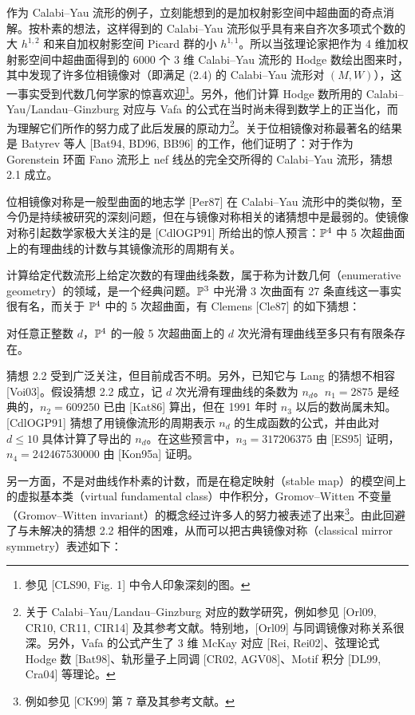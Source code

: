 作为 Calabi–Yau 流形的例子，立刻能想到的是加权射影空间中超曲面的奇点消解。按朴素的想法，这样得到的 Calabi–Yau 流形似乎具有来自齐次多项式个数的大 $h^{1,2}$ 和来自加权射影空间 Picard 群的小 $h^{1,1}$。所以当弦理论家把作为 4 维加权射影空间中超曲面得到的 6000 个 3 维 Calabi–Yau 流形的 Hodge 数绘出图来时，其中发现了许多位相镜像对（即满足 (2.4) 的 Calabi–Yau 流形对 $(M,W)$），这一事实受到代数几何学家的惊喜欢迎\footnote{参见 [CLS90, Fig. 1] 中令人印象深刻的图。}。另外，他们计算 Hodge 数所用的 Calabi–Yau/Landau–Ginzburg 对应与 Vafa 的公式在当时尚未得到数学上的正当化，而为理解它们所作的努力成了此后发展的原动力\footnote{关于 Calabi–Yau/Landau–Ginzburg 对应的数学研究，例如参见 [Orl09, CR10, CR11, CIR14] 及其参考文献。特别地，[Orl09] 与同调镜像对称关系很深。另外，Vafa 的公式产生了 3 维 McKay 对应 [Rei, Rei02]、弦理论式 Hodge 数 [Bat98]、轨形量子上同调 [CR02, AGV08]、Motif 积分 [DL99, Cra04] 等理论。}。关于位相镜像对称最著名的结果是 Batyrev 等人 [Bat94, BD96, BB96] 的工作，他们证明了：对于作为 Gorenstein 环面 Fano 流形上 nef 线丛的完全交所得的 Calabi–Yau 流形，猜想 2.1 成立。


位相镜像对称是一般型曲面的地志学 [Per87] 在 Calabi–Yau 流形中的类似物，至今仍是持续被研究的深刻问题，但在与镜像对称相关的诸猜想中是最弱的。使镜像对称引起数学家极大关注的是 [CdlOGP91] 所给出的惊人预言：$\mathbb{P}^4$ 中 5 次超曲面上的有理曲线的计数与其镜像流形的周期有关。

计算给定代数流形上给定次数的有理曲线条数，属于称为计数几何（enumerative geometry）的领域，是一个经典问题。$\mathbb{P}^3$ 中光滑 3 次曲面有 27 条直线这一事实很有名，而关于 $\mathbb{P}^4$ 中的 5 次超曲面，有 Clemens [Cle87] 的如下猜想：

 对任意正整数 $d$，$\mathbb{P}^4$ 的一般 5 次超曲面上的 $d$ 次光滑有理曲线至多只有有限条存在。

猜想 2.2 受到广泛关注，但目前成否不明。另外，已知它与 Lang 的猜想不相容 [Voi03]。假设猜想 2.2 成立，记 $d$ 次光滑有理曲线的条数为 $n_d$。$n_1=2875$ 是经典的，$n_2=609250$ 已由 [Kat86] 算出，但在 1991 年时 $n_3$ 以后的数尚属未知。[CdlOGP91] 猜想了用镜像流形的周期表示 $n_d$ 的生成函数的公式，并由此对 $d\le10$ 具体计算了导出的 $n_d$。在这些预言中，$n_3=317206375$ 由 [ES95] 证明，$n_4=242467530000$ 由 [Kon95a] 证明。

另一方面，不是对曲线作朴素的计数，而是在稳定映射（stable map）的模空间上的虚拟基本类（virtual fundamental class）中作积分，Gromov–Witten 不变量（Gromov–Witten invariant）的概念经过许多人的努力被表述了出来\footnote{例如参见 [CK99] 第 7 章及其参考文献。}。由此回避了与未解决的猜想 2.2 相伴的困难，从而可以把古典镜像对称（classical mirror symmetry）表述如下：

